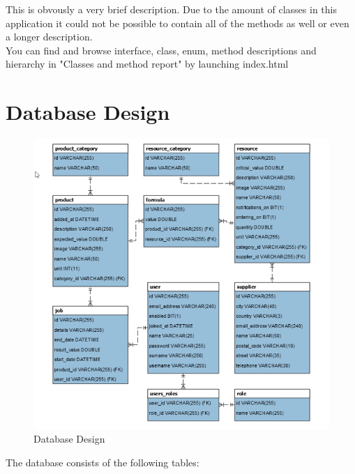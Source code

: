 \documentclass[a4paper,11pt,twoside]{report}
\theoremstyle{definition}
\begin{document}
This is obvously a very brief description. Due to the amount of classes in this application it could not be possible to contain all of the methods as well or even a longer description. \\
You can find and browse interface, class, enum, method descriptions and hierarchy in "Classes and method report" by launching index.html
\section{Database Design}
 

\begin{figure}[hb!]

\begin{center}

\includegraphics{DB4}

\end{center}
\caption{Database Design}
\end{figure}

The database consists of the following tables:
\end{document}
